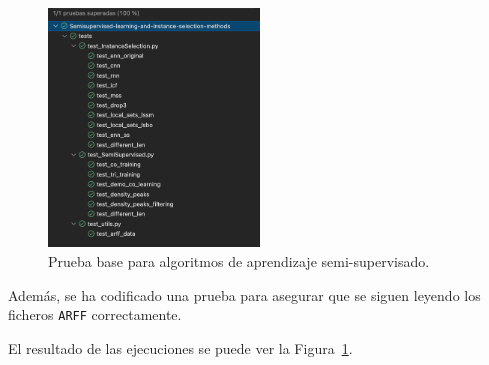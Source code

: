 \begin{figure}
\centering
\includegraphics[width=0.5\textwidth]{../img/anexos/manual-programador/tests-superados-is-ssl}
\caption{Prueba base para algoritmos de aprendizaje semi-supervisado.}\label{fig:tests-superados-is-ssl}

\end{figure}

Además, se ha codificado una prueba para asegurar que se siguen leyendo los ficheros \texttt{ARFF} correctamente.

El resultado de las ejecuciones se puede ver la Figura~\ref{fig:tests-superados-is-ssl}.
















